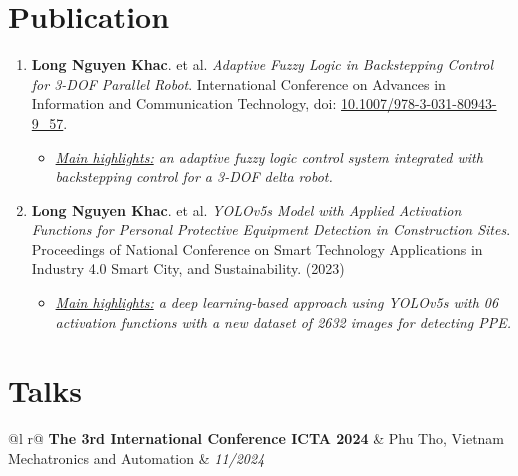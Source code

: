 \documentclass[letterpaper,9pt]{extarticle}
\begin{document}
\section{Publication}
    \begin{enumerate}
        \item \textbf{Long Nguyen Khac}. et al. \textit{Adaptive Fuzzy Logic in Backstepping Control for 3-DOF Parallel Robot}. International Conference on Advances in Information and Communication Technology, doi: \href{https://doi.org/10.1007/978-3-031-80943-9_57}{10.1007/978-3-031-80943-9\_57}.
        \begin{itemize}
            \item \textit{\underline{Main highlights:} an adaptive fuzzy logic control system integrated with backstepping control for a 3-DOF delta robot.}
        \end{itemize}
        \item \textbf{Long Nguyen Khac}. et al. \textit{YOLOv5s Model with Applied Activation Functions for Personal Protective Equipment Detection in Construction Sites}. Proceedings of National Conference on Smart Technology Applications in Industry 4.0 Smart City, and Sustainability. (2023)
        \begin{itemize}
            \item \textit{\underline{Main highlights:} a deep learning-based approach using YOLOv5s with 06 activation functions with a new dataset of 2632 images for detecting PPE.}
        \end{itemize}
    \end{enumerate}
\section{Talks}
\begin{tabularx}{\linewidth}{ @{}l r@{} }
\textbf{The 3rd International Conference ICTA 2024} & \hfill Phu Tho, Vietnam \\[3.75pt]
Mechatronics and Automation & \hfill \textit{11/2024} \\[3.75pt]
\vspace{-0.6cm}
\end{tabularx}

\end{document}
